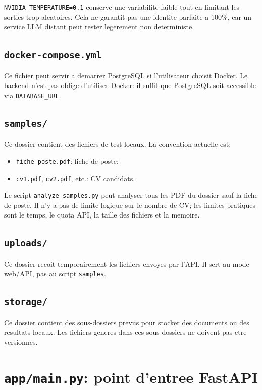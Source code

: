 \documentclass[12pt,a4paper]{article}
\begin{document}
\texttt{NVIDIA\_TEMPERATURE=0.1} conserve une variabilite faible tout en limitant les sorties trop aleatoires. Cela ne garantit pas une identite parfaite a 100\%, car un service LLM distant peut rester legerement non deterministe.

\subsection{\texttt{docker-compose.yml}}

Ce fichier peut servir a demarrer PostgreSQL si l'utilisateur choisit Docker. Le backend n'est pas oblige d'utiliser Docker: il suffit que PostgreSQL soit accessible via \texttt{DATABASE\_URL}.

\subsection{\texttt{samples/}}

Ce dossier contient des fichiers de test locaux. La convention actuelle est:

\begin{itemize}
  \item \texttt{fiche\_poste.pdf}: fiche de poste;
  \item \texttt{cv1.pdf}, \texttt{cv2.pdf}, etc.: CV candidats.
\end{itemize}

Le script \texttt{analyze\_samples.py} peut analyser tous les PDF du dossier sauf la fiche de poste. Il n'y a pas de limite logique sur le nombre de CV; les limites pratiques sont le temps, le quota API, la taille des fichiers et la memoire.

\subsection{\texttt{uploads/}}

Ce dossier recoit temporairement les fichiers envoyes par l'API. Il sert au mode web/API, pas au script \texttt{samples}. 

\subsection{\texttt{storage/}}

Ce dossier contient des sous-dossiers prevus pour stocker des documents ou des resultats locaux. Les fichiers generes dans ces sous-dossiers ne doivent pas etre versionnes.

\section{\texttt{app/main.py}: point d'entree FastAPI}
\end{document}
